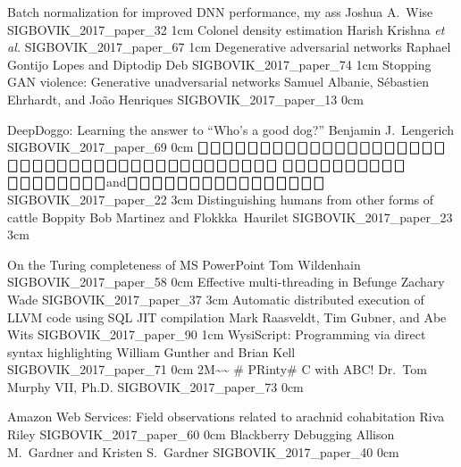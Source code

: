 \addpaper
	{Batch normalization for improved DNN performance, my ass}
	{Joshua A.\ Wise}
	{}
	{SIGBOVIK_2017_paper_32}
	{1cm}
	{}
\addpaper
	{Colonel density estimation}
	{Harish Krishna \textit{et al.}}
	{}
	{SIGBOVIK_2017_paper_67}
	{1cm}
	{}
\addpaper
	{Degenerative adversarial networks}
	{Raphael Gontijo Lopes and Diptodip Deb}
	{}
	{SIGBOVIK_2017_paper_74}
	{1cm}
	{}
\addpaper
	{Stopping GAN violence: Generative unadversarial networks}
	{Samuel Albanie, S\'ebastien Ehrhardt, and Jo\~ao Henriques}
	{}
	{SIGBOVIK_2017_paper_13}
	{0cm}
	{}


\addpaper
	{DeepDoggo: Learning the answer to ``Who's a good dog?''}
	{Benjamin J.\ Lengerich}
	{}
	{SIGBOVIK_2017_paper_69}
	{0cm}
	{}
\addpaper
	{$\bigbox\bigbox\bigbox\bigbox\bigbox\bigbox\bigbox\bigbox\bigbox\bigbox\bigbox\bigbox\bigbox\bigbox$\quad $\bigbox\bigbox\bigbox\bigbox\bigbox\bigbox$\quad $\bigbox\bigbox\bigbox\bigbox$\quad $\bigbox\bigbox\bigbox\bigbox\bigbox$\quad $\bigbox\bigbox\bigbox\bigbox\bigbox$\quad $\bigbox\bigbox$\quad $\bigbox\bigbox\bigbox\bigbox\bigbox\bigbox$}
	{$\bigbox\bigbox\bigbox\bigbox\bigbox\bigbox\bigbox$\quad $\bigbox\bigbox\bigbox$\quad $\bigbox\bigbox\bigbox\bigbox\bigbox\bigbox\bigbox\bigbox$\quad and\quad $\bigbox\bigbox\bigbox\bigbox\bigbox\bigbox\bigbox\bigbox$\quad $\bigbox\bigbox\bigbox\bigbox\bigbox\bigbox\bigbox\bigbox$}
	{}
	{SIGBOVIK_2017_paper_22}
	{3cm}
	{}
\addpaper
	{Distinguishing humans from other forms of cattle}
	{Boppity Bob Martinez and Flokkka\textdegree\ Haurilet}
	{}
	{SIGBOVIK_2017_paper_23}
	{3cm}
	{}

\addpaper
	{On the Turing completeness of MS PowerPoint}
	{Tom Wildenhain}
	{}
	{SIGBOVIK_2017_paper_58}
	{0cm}
	{}
\addpaper
	{Effective multi-threading in Befunge}
	{Zachary Wade}
	{}
	{SIGBOVIK_2017_paper_37}
	{3cm}
	{}
\addpaper
	{Automatic distributed execution of LLVM code using SQL JIT compilation}
	{Mark Raasveldt, Tim Gubner, and Abe Wits}
	{}
	{SIGBOVIK_2017_paper_90}
	{1cm}
	{}
\addpaper
	{WysiScript: Programming via direct syntax highlighting}
	{William Gunther and Brian Kell}
	{}
	{SIGBOVIK_2017_paper_71}
	{0cm}
	{}
\addpaper
	{2M\~{}\~{} \# PRinty\# C with ABC!}
	{Dr.\ Tom Murphy VII, Ph.D.}
	{}
	{SIGBOVIK_2017_paper_73}
	{0cm}
	{}

\addpaper
	{Amazon Web Services: Field observations related to arachnid cohabitation}
	{Riva Riley}
	{}
	{SIGBOVIK_2017_paper_60}
	{0cm}
	{}
\addpaper
	{Blackberry Debugging}
	{Allison M.\ Gardner and Kristen S.\ Gardner}
	{}
	{SIGBOVIK_2017_paper_40}
	{0cm}
	{}

